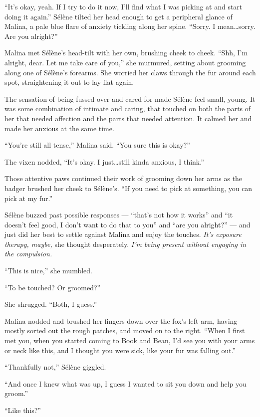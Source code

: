 ``It's okay, yeah. If I try to do it now, I'll find what I was picking at and start doing it again.'' Sélène tilted her head enough to get a peripheral glance of Malina, a pale blue flare of anxiety tickling along her spine. ``Sorry. I mean\ldots{}sorry. Are you alright?''

Malina met Sélène's head-tilt with her own, brushing cheek to cheek. ``Shh, I'm alright, dear. Let me take care of you,'' she murmured, setting about grooming along one of Sélène's forearms. She worried her claws through the fur around each spot, straightening it out to lay flat again.

The sensation of being fussed over and cared for made Sélène feel small, young. It was some combination of intimate and caring, that touched on both the parts of her that needed affection and the parts that needed attention. It calmed her and made her anxious at the same time.

``You're still all tense,'' Malina said. ``You sure this is okay?''

The vixen nodded, ``It's okay. I just\ldots{}still kinda anxious, I think.''

Those attentive paws continued their work of grooming down her arms as the badger brushed her cheek to Sélène's. ``If you need to pick at something, you can pick at my fur.''

Sélène buzzed past possible responses --- ``that's not how it works'' and ``it doesn't feel good, I don't want to do that to you'' and ``are you alright?'' --- and just did her best to settle against Malina and enjoy the touches. \emph{It's exposure therapy, maybe,} she thought desperately. \emph{I'm being present without engaging in the compulsion.}

``This is nice,'' she mumbled.

``To be touched? Or groomed?''

She shrugged. ``Both, I guess.''

Malina nodded and brushed her fingers down over the fox's left arm, having mostly sorted out the rough patches, and moved on to the right. ``When I first met you, when you started coming to Book and Bean, I'd see you with your arms or neck like this, and I thought you were sick, like your fur was falling out.''

``Thankfully not,'' Sélène giggled.

``And once I knew what was up, I guess I wanted to sit you down and help you groom.''

``Like this?''

